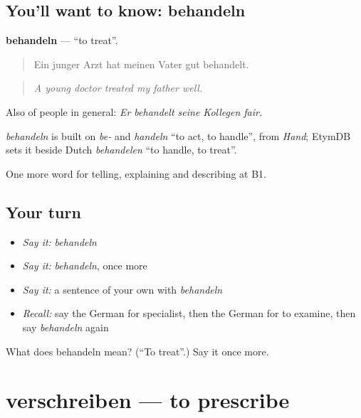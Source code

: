 \subsection*{You'll want to know: behandeln}
\textbf{behandeln} — \textquotedblleft{}to treat\textquotedblright{}.

\begin{quote}
Ein junger Arzt hat meinen Vater gut behandelt.
\end{quote}

\begin{quote}
\emph{A young doctor treated my father well.}
\end{quote}

Also of people in general: \emph{Er behandelt seine Kollegen fair.}

\begin{cousinweb}
\emph{behandeln} is built on \emph{be-} and \emph{handeln} \textquotedblleft{}to act, to handle\textquotedblright{}, from \emph{Hand}; EtymDB sets it beside Dutch \emph{behandelen} \textquotedblleft{}to handle, to treat\textquotedblright{}.
\end{cousinweb}

\begin{grammarlens}[title={What you've built}]
One more word for telling, explaining and describing at B1.
\end{grammarlens}

\subsection*{Your turn}
\begin{itemize}
\raggedright
  \item \emph{Say it:} \emph{behandeln}
  \item \emph{Say it:} \emph{behandeln}, once more
  \item \emph{Say it:} a sentence of your own with \emph{behandeln}
  \item \emph{Recall:} say the German for specialist, then the German for to examine, then say \emph{behandeln} again
\end{itemize}

\begin{tcolorbox}[breakable,colback=teal!4,colframe=teal!35!black,title={Before you move on}]
What does behandeln mean? (\textquotedblleft{}To treat\textquotedblright{}.) Say it once more.
\end{tcolorbox}
\section[verschreiben]{verschreiben — to prescribe}

